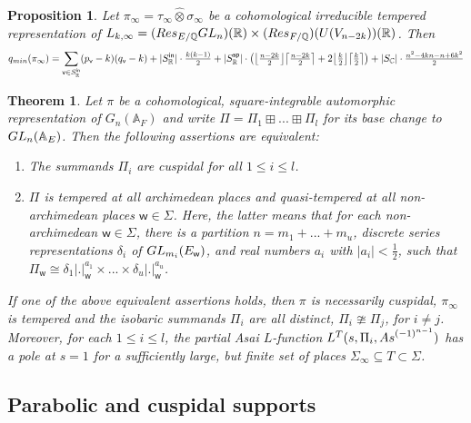\documentclass[10pt,a4paper]{amsart}
\newtheorem{prop}{Proposition}
\newtheorem{thm}{Theorem}
\def\A{\mathbb A}
\def\C{\mathbb C}
\def\GL{{\rm GL}}
\def\Q{\mathbb Q}
\def\R{\mathbb R}
\def\Res{{\rm Res}}
\def\vv{{\sf v}} %
\def\ww{\mathsf w}
\begin{document}
\begin{prop}\label{prop:qminLk}
Let $\pi_\infty=\tau_\infty\hat\otimes\sigma_\infty$ be a cohomological irreducible tempered representation of $L_{k,\infty}=(\Res_{E/\Q}\GL_n)(\R)\times (\Res_{F/\Q})(U(V_{n-2k}))(\R)$. Then
$$q_{min}(\pi_\infty)=\sum_{\vv\in S^{\sf in}_\R}(p_\vv-k)(q_\vv-k) + |S^{\sf in}_\R| \cdot\tfrac{k(k-1)}{2}+ |S^{\sf sp}_\R| \cdot\left(\big\lfloor\tfrac{n-2k}{2}\big\rfloor\big\lceil\tfrac{n-2k}{2}\big\rceil+2\big\lfloor\tfrac{k}{2}\big\rfloor\big\lceil\tfrac{k}{2}\big\rceil\right) + |S_\C| \cdot\tfrac{n^2-4kn-n+6k^2}{2}$$
\end{prop}

\begin{thm}\label{thm:qtcusp}
Let $\pi$ be a cohomological, square-integrable automorphic representation of $G_n(\A_F)$ and write $\Pi=\Pi_1\boxplus...\boxplus\Pi_l$ for its base change to $\GL_n(\A_E)$. Then the following assertions are equivalent:
\begin{enumerate}
\item The summands $\Pi_i$ are cuspidal for all $1\leq i\leq l$.
\item $\Pi$ is tempered at all archimedean places and quasi-tempered at all non-archimedean places $\ww\in\Sigma$. Here, the latter means that for each non-archimedean $\ww\in\Sigma$, there is a partition $n=m_1+...+m_u$, discrete series representations $\delta_{i}$ of $\GL_{m_i}(E_\ww)$, and real numbers $a_{i}$ with $|a_{i}|<\tfrac12$, such that $\Pi_\ww\cong\delta_{1} |.|_\ww^{a_{1}}\times...\times\delta_{u} |.|_\ww^{a_{u}}$. 
\end{enumerate}
If one of the above equivalent assertions holds, then $\pi$ is necessarily cuspidal, $\pi_\infty$ is tempered and the isobaric summands $\Pi_i$ are all distinct, $\Pi_i\ncong\Pi_j$, for $i\neq j$. Moreover, for each $1\leq i\leq l$, the partial Asai $L$-function $L^T(s,\Pi_i,{\rm As}^{(-1)^{n-1}})$ has a pole at $s=1$ for a sufficiently large, but finite set of places $\Sigma_\infty\subseteq T\subset \Sigma$.
\end{thm}

\subsection{Parabolic and cuspidal supports}\label{sect:pc}
\end{document}
